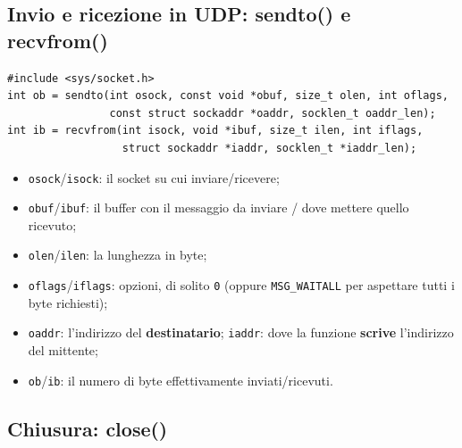 
\subsection{Invio e ricezione in UDP: sendto() e recvfrom()}

\begin{lstlisting}[language={[POSIX]C}]
#include <sys/socket.h>
int ob = sendto(int osock, const void *obuf, size_t olen, int oflags,
                const struct sockaddr *oaddr, socklen_t oaddr_len);
int ib = recvfrom(int isock, void *ibuf, size_t ilen, int iflags,
                  struct sockaddr *iaddr, socklen_t *iaddr_len);
\end{lstlisting}

\begin{itemize}
    \item \texttt{osock}/\texttt{isock}: il socket su cui inviare/ricevere;
    \item \texttt{obuf}/\texttt{ibuf}: il buffer con il messaggio da inviare / dove mettere quello ricevuto;
    \item \texttt{olen}/\texttt{ilen}: la lunghezza in byte;
    \item \texttt{oflags}/\texttt{iflags}: opzioni, di solito \texttt{0} (oppure \texttt{MSG\_WAITALL} per aspettare
          tutti i byte richiesti);
    \item \texttt{oaddr}: l'indirizzo del \textbf{destinatario}; \texttt{iaddr}: dove la funzione \textbf{scrive}
          l'indirizzo del mittente;
    \item \texttt{ob}/\texttt{ib}: il numero di byte effettivamente inviati/ricevuti.
\end{itemize}


\subsection{Chiusura: close()}

